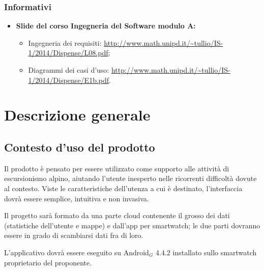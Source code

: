 \subsubsection{Informativi}
\begin{itemize}
\item \textbf{Slide del corso Ingegneria del Software modulo A:}
\begin{itemize}
\item Ingegneria dei requisiti: \url{http://www.math.unipd.it/~tullio/IS-1/2014/Dispense/L08.pdf};
\item Diagrammi dei casi d'uso: \url{http://www.math.unipd.it/~tullio/IS-1/2014/Dispense/E1b.pdf}.
\end{itemize}
\end{itemize}

\clearpage
\section{Descrizione generale}
\subsection{Contesto d'uso del prodotto}
Il prodotto è pensato per essere utilizzato come supporto alle attività di escursionismo alpino, aiutando l'utente inesperto nelle ricorrenti difficoltà dovute al contesto. Viste le caratteristiche dell'utenza a cui è destinato, l'interfaccia dovrà essere semplice, intuitiva e non invasiva.

Il progetto sarà formato da una parte cloud contenente il grosso dei dati (statistiche dell'utente e mappe) e dall'app per smartwatch; le due parti dovranno essere in grado di scambiarsi dati fra di loro. 

L'applicativo dovrà essere eseguito su Android$_{G}$ 4.4.2 installato sullo smartwatch proprietario del proponente. 

